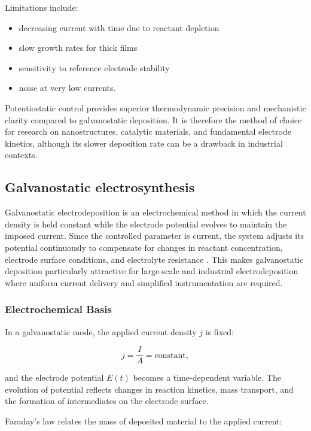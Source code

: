 \documentclass[12pt,a4paper]{report}
\begin{document}
	
	Limitations include:
	
	\begin{itemize}
		\item decreasing current with time due to reactant depletion
		\item slow growth rates for thick films
		\item sensitivity to reference electrode stability
		\item noise at very low currents.
	\end{itemize}
	
	
	Potentiostatic control provides superior thermodynamic precision and mechanistic
	clarity compared to galvanostatic deposition. It is therefore the method of
	choice for research on nanostructures, catalytic materials, and fundamental
	electrode kinetics, although its slower deposition rate can be a drawback in 
	industrial contexts. \cite{Xi2014}
	
	
	
	\subsection{Galvanostatic electrosynthesis}
	Galvanostatic electrodeposition is an electrochemical method in which the
	current density is held constant while the electrode potential evolves to 
	maintain the imposed current. Since the controlled parameter is current,
	the system adjusts its potential continuously to compensate for changes in
	reactant concentration, electrode surface conditions, and electrolyte resistance
	\cite{Schotten2020}. This makes galvanostatic deposition particularly attractive for large-scale and industrial electrodeposition where uniform current delivery
	and simplified instrumentation are required.
	
	\subsubsection{Electrochemical Basis}
	
	In a galvanostatic mode, the applied current density \( j \) is fixed:
	
	\[
	j = \frac{I}{A} = \text{constant},
	\]
	
	and the electrode potential \( E(t) \) becomes a time-dependent variable.
	The evolution of potential reflects changes in reaction kinetics, mass
	transport, and the formation of intermediates on the electrode surface. \cite{Jadhav2021}
	
	Faraday’s law relates the mass of deposited material to the applied current:
	
\end{document}
